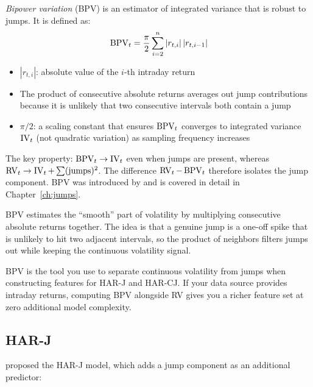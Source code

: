\begin{prereq}
\emph{Bipower variation} (BPV) is an estimator of integrated variance that is robust to jumps.
It is defined as:
\begin{equation}
  \operatorname{BPV}_t = \frac{\pi}{2} \sum_{i=2}^{n} |r_{t,i}|\,|r_{t,i-1}|
  \label{eq:bpv-def}
\end{equation}
\begin{itemize}[nosep]
  \item $|r_{t,i}|$: absolute value of the $i$-th intraday return
  \item The product of consecutive absolute returns averages out jump contributions because it is unlikely that two consecutive intervals both contain a jump
  \item $\pi/2$: a scaling constant that ensures $\operatorname{BPV}_t$ converges to integrated variance $\operatorname{IV}_t$ (not quadratic variation) as sampling frequency increases
\end{itemize}
The key property: $\operatorname{BPV}_t \to \operatorname{IV}_t$ even when jumps are present, whereas $\operatorname{RV}_t \to \operatorname{IV}_t + \sum(\text{jumps})^2$.
The difference $\operatorname{RV}_t - \operatorname{BPV}_t$ therefore isolates the jump component.
BPV was introduced by \citet{BNS2004} and is covered in detail in Chapter~\ref{ch:jumps}.
\end{prereq}

\begin{intuition}
BPV estimates the ``smooth'' part of volatility by multiplying consecutive absolute returns together.
The idea is that a genuine jump is a one-off spike that is unlikely to hit two adjacent intervals, so the product of neighbors filters jumps out while keeping the continuous volatility signal.
\end{intuition}

\begin{projectconnection}
BPV is the tool you use to separate continuous volatility from jumps when constructing features for HAR-J and HAR-CJ.
If your data source provides intraday returns, computing BPV alongside RV gives you a richer feature set at zero additional model complexity.
\end{projectconnection}

\subsection{HAR-J}

\citet{ABD2007} proposed the HAR-J model, which adds a jump component as an additional predictor:

